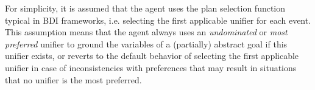 





For simplicity, it is assumed that the agent uses the plan selection function typical in BDI frameworks, i.e. selecting the first applicable unifier for each event. This assumption means that the agent always uses an \textit{undominated} or \textit{most preferred} unifier to ground the variables of a (partially) abstract goal if this unifier exists, or reverts to the default behavior of selecting the first applicable unifier in case of inconsistencies with preferences that may result in situations that no unifier is the most preferred.



